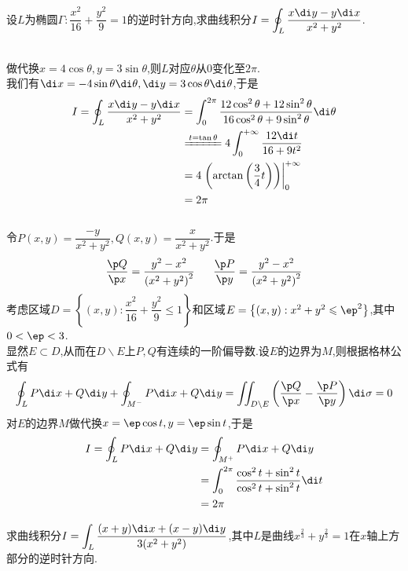 \documentclass{ctexart}
\begin{document}
\pagestyle{empty}
\begin{center}
    \large{}
\end{center}
\begin{problem}[L.5.1]
    设$L$为椭圆$\Gamma:\dfrac{x^2}{16}+\dfrac{y^2}{9}=1$的逆时针方向,求曲线积分$I=\displaystyle\oint_{L}\dfrac{x\di y-y\di x}{x^2+y^2}$.
\end{problem}
\begin{solution}
    \\
    做代换$x=4\cos\theta,y=3\sin\theta$,则$L$对应$\theta$从$0$变化至$2\pi$.\\
    我们有$\di x=-4\sin\theta\di\theta,\di y=3\cos\theta\di\theta$,于是
    \[\begin{aligned}
        I=\oint_{L}\dfrac{x\di y-y\di x}{x^2+y^2}
        &= \int_0^{2\pi}\dfrac{12\cos^2\theta+12\sin^2\theta}{16\cos^2\theta+9\sin^2\theta}\di\theta \\
        &\xlongequal{t=\tan\theta}4\int_0^{+\infty}\dfrac{12\di t}{16+9t^2} \\
        &= 4\left.\left(\arctan\left(\dfrac{3}{4}t\right)\right)\right|_0^{+\infty} \\
        &= 2\pi
    \end{aligned}\]
    \\
    令$P(x,y)=\dfrac{-y}{x^2+y^2},Q(x,y)=\dfrac{x}{x^2+y^2}$.于是
    \[\dfrac{\p Q}{\p x}=\dfrac{y^2-x^2}{\left(x^2+y^2\right)^2}\ \ \ \ \ \dfrac{\p P}{\p y}=\dfrac{y^2-x^2}{\left(x^2+y^2\right)^2}\]
    考虑区域$D=\left\{(x,y):\dfrac{x^2}{16}+\dfrac{y^2}{9}\leqslant1\right\}$和区域$E=\left\{(x,y):x^2+y^2\leqslant\ep^2\right\}$,其中$0<\ep<3$.\\
    显然$E\subset D$,从而在$D\backslash E$上$P,Q$有连续的一阶偏导数.设$E$的边界为$M$,则根据格林公式有
    \[\oint_{L}P\di x+Q\di y+\oint_{M^{-}}P\di x+Q\di y=\iint_{D\backslash E}\left(\dfrac{\p Q}{\p x}-\dfrac{\p P}{\p y}\right)\di\sigma=0\]
    对$E$的边界$M$做代换$x=\ep\cos t,y=\ep\sin t$,于是
    \[\begin{aligned}
        I=\oint_{L}P\di x+Q\di y
        &= \oint_{M^+}P\di x+Q\di y \\
        &= \int_0^{2\pi}\dfrac{\cos^2t+\sin^2t}{\cos^2t+\sin^2t}\di t \\
        &= 2\pi
    \end{aligned}\]
\end{solution}
\begin{problem}[L.5.2]
    求曲线积分$\displaystyle I=\int_L\dfrac{(x+y)\di x+(x-y)\di y}{3(x^2+y^2)}$,其中$L$是曲线$x^{\frac23}+y^{\frac23}=1$在$x$轴上方部分的逆时针方向.
\end{problem}
\end{document}

